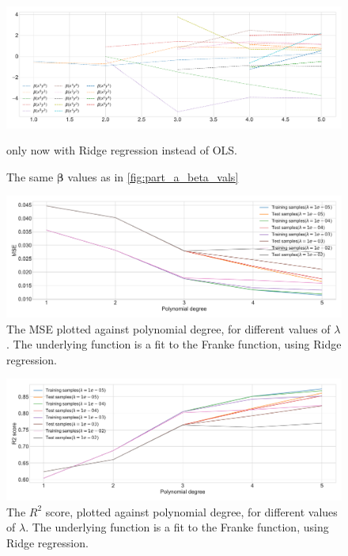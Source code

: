 \documentclass[12pt]{article}
\begin{document}
\begin{figure}
    \centering
    \includegraphics[width=1\linewidth]{images/part_b_beta_vals.pdf}
    \caption{The same $\boldsymbol{\beta}$ values as in \autoref{fig:part_a_beta_vals}} only now with Ridge regression instead of OLS.
    \label{fig:part_b_beta_vals}
\end{figure}

\begin{figure}
    \centering
    \includegraphics[width=1\linewidth]{images/part_b_MSE_deg5.pdf}
    \caption{The MSE plotted against polynomial degree, for different values of $\lambda$. The underlying function is a fit to the Franke function, using Ridge regression.}
    \label{fig:part_b_MSE_deg5}
\end{figure}

\begin{figure}
    \centering
    \includegraphics[width=1\linewidth]{images/part_b_r2score_deg5.pdf}
    \caption{The $R^2$ score, plotted against polynomial degree, for different values of $\lambda$. The underlying function is a fit to the Franke function, using Ridge regression.}
    \label{fig:part_b_r2score_deg5}
\end{figure}
\end{document}
